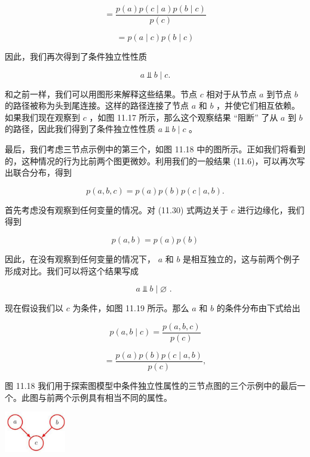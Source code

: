 \documentclass[10pt]{article}
\begin{document}
\[
= \frac{p\left( a\right) p\left( {c \mid  a}\right) p\left( {b \mid  c}\right) }{p\left( c\right) }
\]

\[
= p\left( {a \mid  c}\right) p\left( {b \mid  c}\right)
\]

因此，我们再次得到了条件独立性性质

\[
a ⫫ b \mid  c.
\]

和之前一样，我们可以用图形来解释这些结果。节点 \(c\) 相对于从节点 \(a\) 到节点 \(b\) 的路径被称为头到尾连接。这样的路径连接了节点 \(a\) 和 \(b\) ，并使它们相互依赖。如果我们现在观察到 \(c\) ，如图 11.17 所示，那么这个观察结果 “阻断” 了从 \(a\) 到 \(b\) 的路径，因此我们得到了条件独立性性质 \(a ⫫ b \mid  c\) 。

最后，我们考虑三节点示例中的第三个，如图 11.18 中的图所示。正如我们将看到的，这种情况的行为比前两个图更微妙。利用我们的一般结果 (11.6)，可以再次写出联合分布，得到

\[
p\left( {a,b,c}\right)  = p\left( a\right) p\left( b\right) p\left( {c \mid  a,b}\right) . \tag{11.30}
\]

首先考虑没有观察到任何变量的情况。对 (11.30) 式两边关于 \(c\) 进行边缘化，我们得到

\[
p\left( {a,b}\right)  = p\left( a\right) p\left( b\right)
\]

因此，在没有观察到任何变量的情况下， \(a\) 和 \(b\) 是相互独立的，这与前两个例子形成对比。我们可以将这个结果写成

\[
a ⫫ b \mid  \varnothing \text{ . } \tag{11.31}
\]

现在假设我们以 \(c\) 为条件，如图 11.19 所示。那么 \(a\) 和 \(b\) 的条件分布由下式给出

\[
p\left( {a,b \mid  c}\right)  = \frac{p\left( {a,b,c}\right) }{p\left( c\right) }
\]

\[
= \frac{p\left( a\right) p\left( b\right) p\left( {c \mid  a,b}\right) }{p\left( c\right) },
\]

图 11.18 我们用于探索图模型中条件独立性属性的三节点图的三个示例中的最后一个。此图与前两个示例具有相当不同的属性。

\begin{center}
\includegraphics[max width=0.2\textwidth]{images/0194e279-9b28-703a-88f4-c3ac21e2010d_359_1284_1837_264_177_0.jpg}
\end{center}
\hspace*{3em} 
\end{document}
